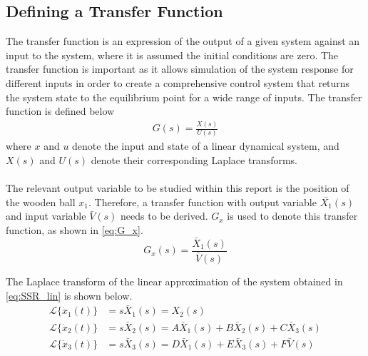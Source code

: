 \documentclass[a4paper,10pt,reqno]{amsart}
\numberwithin{equation}{section}
\newcommand{\lap}{\mathscr{L}}
\begin{document}
\subsection{Defining a Transfer Function} 
The transfer function is an expression of the output of a given system against an input to the system, where it is assumed the initial conditions are zero. The transfer function is important as it allows simulation of the system response for different inputs in order to create a comprehensive control system that returns the system state to the equilibrium point for a wide range of inputs. The transfer function is defined below
\begin{align}
G(s) = \frac{X(s)}{U(s)}
\end{align}
where $x$ and $u$ denote the input and state of a linear dynamical system, and $X(s)$ and $U(s)$ denote their corresponding Laplace transforms.
\\ \\
The relevant output variable to be studied within this report is the position of the wooden ball $x_1$. Therefore, a transfer function with output variable $\bar{X_1}(s)$  and input variable $\bar{V}(s)$ needs to be derived. $G_x$ is used to denote this transfer function, as shown in \eqref{eq:G_x}.
\begin{equation}
    \label{eq:G_x}
    G_x(s)=\frac{\bar X_1(s)}{\bar V(s)}
\end{equation}

The Laplace transform of the linear approximation of the system obtained in \eqref{eq:SSR_lin} is shown below.
\begin{align*}
    \lap\{\dot x_1(t)\} &= s\bar X_1(s) = X_2(s) \\
    \lap\{\dot x_2(t)\} &= s\bar X_2(s) = A\bar X_1(s)+B\bar X_2(s)+C\bar X_3(s) \\
    \lap\{\dot x_3(t)\} &= s\bar X_3(s) = D\bar X_1(s)+E\bar X_3(s)+F\bar V(s) \\
\end{align*}
\end{document}

